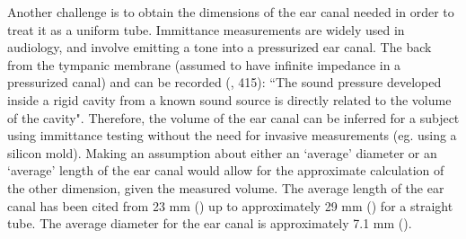\DIFdelbegin %
{%
}
\DIFdelend %

Another challenge is to obtain the dimensions of the ear canal needed in order to treat it as a uniform tube\DIFdelbegin {}\DIFdelend . Immittance measurements are widely used in audiology, and involve emitting a \DIFdelbegin {}\DIFdelend \DIFaddbegin {}\DIFaddend tone into a pressurized ear canal.  The \DIFdelbegin {}\DIFdelend \DIFaddbegin {}\DIFaddend back from the tympanic membrane (assumed to have infinite impedance in a pressurized canal) and can be recorded (\cite{ballachanda:97}, 415): ``The sound pressure developed inside a rigid cavity from a known sound source is directly related to the volume of the cavity".  Therefore, the volume of the ear canal can be inferred for a subject using immittance testing without the need for invasive measurements (eg. using a silicon mold).  Making an assumption about either an `average' diameter or an `average' length of the ear canal would allow for the approximate calculation of the other dimension, given the measured volume. The average length of the ear canal has been cited from 23 mm (\cite{rosen:91}) up to approximately 29 mm (\cite{stinson:89}) for a straight tube. The average diameter for the ear canal is approximately 7.1 mm (\cite{salvinelli:91}).

